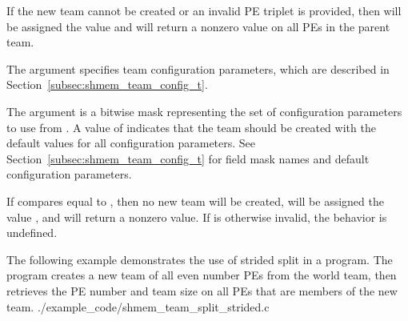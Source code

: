 \begin{apidefinition}
{If the new team cannot be created or an invalid \ac{PE} triplet is provided,
then  will be assigned the value  and
 will return a nonzero value on all
\acp{PE} in the parent team.

The  argument specifies team configuration parameters, which are
described in Section~\ref{subsec:shmem_team_config_t}.

The  argument is a bitwise mask representing the set of
configuration parameters to use from .
A  value of  indicates that the team
should be created with the default values for all configuration parameters.
See Section~\ref{subsec:shmem_team_config_t} for field mask names and
default configuration parameters.

If 
compares equal to , then no new team
will be created,  will be assigned the value
, and  will
return a nonzero value.  If  is otherwise invalid, the
behavior is undefined.
}



\begin{apiexamples}

    \apicexample
    {The following example demonstrates the use of strided split in a
    \Cstd[11] program. The program creates a new team of all even number
    \acp{PE} from the world team, then retrieves the \ac{PE} number and
    team size on all \acp{PE} that are members of the new team.}
    {./example_code/shmem_team_split_strided.c}
    {}

\end{apiexamples}

\end{apidefinition}
